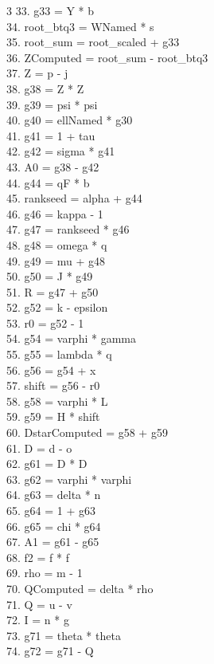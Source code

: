 \documentclass[10pt]{article}
\begin{document}
\begin{multicols}{3}
33. g33 = Y * b\\
34. root\_btq3 = WNamed * s\\
35. root\_sum = root\_scaled + g33\\
36. ZComputed = root\_sum - root\_btq3\\
37. Z = p - j\\
38. g38 = Z * Z\\
39. g39 = psi * psi\\
40. g40 = ellNamed * g30\\
41. g41 = 1 + tau\\
42. g42 = sigma * g41\\
43. A0 = g38 - g42\\
44. g44 = qF * b\\
45. rankseed = alpha + g44\\
46. g46 = kappa - 1\\
47. g47 = rankseed * g46\\
48. g48 = omega * q\\
49. g49 = mu + g48\\
50. g50 = J * g49\\
51. R = g47 + g50\\
52. g52 = k - epsilon\\
53. r0 = g52 - 1\\
54. g54 = varphi * gamma\\
55. g55 = lambda * q\\
56. g56 = g54 + x\\
57. shift = g56 - r0\\
58. g58 = varphi * L\\
59. g59 = H * shift\\
60. DstarComputed = g58 + g59\\
61. D = d - o\\
62. g61 = D * D\\
63. g62 = varphi * varphi\\
64. g63 = delta * n\\
65. g64 = 1 + g63\\
66. g65 = chi * g64\\
67. A1 = g61 - g65\\
68. f2 = f * f\\
69. rho = m - 1\\
70. QComputed = delta * rho\\
71. Q = u - v\\
72. I = n * g\\
73. g71 = theta * theta\\
74. g72 = g71 - Q\\

\end{multicols}
\end{document}
